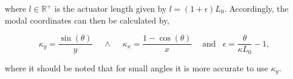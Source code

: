where $l \in \mathbb{R}^{+}$ is the actuator length given by $l = (1+\epsilon)L_0$. Accordingly, the modal coordinates can then be calculated by,

\begin{equation}
    \kappa_y = \frac{\sin(\theta)}{y} \hspace{15pt} 	\land \hspace{15pt}  \kappa_x = \frac{1 -\cos(\theta)}{x} \hspace{15pt} \text{and} \hspace{10pt} \epsilon = \frac{\theta}{\kappa L_0} -1,
\end{equation}

where it should be noted that for small angles it is more accurate to use $\kappa_y$.


